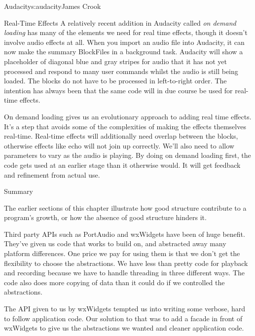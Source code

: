 \begin{aosachapter}{Audacity}{s:audacity}{James Crook}
\begin{aosasect1}{Real-Time Effects}
A relatively recent addition in Audacity called \emph{on demand loading}
has many of the elements we need for real time effects, though it
doesn't involve audio effects at all.  When you import an audio file
into Audacity, it can now make the summary BlockFiles in a background
task.  Audacity will show a placeholder of diagonal blue and gray
stripes for audio that it has not yet processed and respond to many
user commands whilst the audio is still being loaded.  The blocks do
not have to be processed in left-to-right order.  The intention has
always been that the same code will in due course be used for
real-time effects.

On demand loading gives us an evolutionary approach to adding real
time effects.  It's a step that avoids some of the complexities of
making the effects themselves real-time.  Real-time effects will
additionally need overlap between the blocks, otherwise effects like
echo will not join up correctly.  We'll also need to allow parameters
to vary as the audio is playing.  By doing on demand loading first,
the code gets used at an earlier stage than it otherwise would.  It
will get feedback and refinement from actual use.

\end{aosasect1}

\begin{aosasect1}{Summary}

The earlier sections of this chapter illustrate how good structure
contribute to a program's growth, or how the absence of good structure
hinders it.

\begin{aosaitemize}

\item Third party APIs such as PortAudio and wxWidgets have been of
  huge benefit.  They've given us code that works to build on, and
  abstracted away many platform differences.  One price we pay for
  using them is that we don't get the flexibility to choose the
  abstractions.  We have less than pretty code for playback and
  recording because we have to handle threading in three different
  ways.  The code also does more copying of data than it could do if
  we controlled the abstractions.

\item The API given to us by wxWidgets tempted us into writing some
  verbose, hard to follow application code.  Our solution to that was
  to add a facade in front of wxWidgets to give us the abstractions we
  wanted and cleaner application code.


\end{aosaitemize}
\end{aosasect1}
\end{aosachapter}
